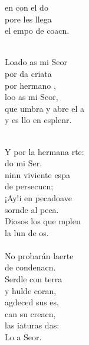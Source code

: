 \begin{cancion}
	en  con el do\\
	pore les llega\\
	el empo de  coacn. \\\jump\\
	\begin{chorus}%
	Loado as mi Seor\\
	por da criata\\
	por  hermano ,\\
	loo as mi Seor,\\
	que umbra y abre el a \\
	y es llo en esplenr.\\
	\end{chorus}%
	\jump\\
	Y por la hermana rte:\\
	do mi Ser.\\
	ninn viviente espa  \\
	de  persecucn;\\
	¡Ay!i en pecadoave\\
	sornde al peca.\\
	Diosos los que mplen \\
	la lun de os.\\
\jump\\
	No probarán laerte \\
	de condenacn.\\
	Serdle con terra \\
	y hulde coran,\\
	agdeced sus es, \\
	can su creacn,\\
	las iaturas das:\\
	Lo a Seor.\\\jump\\

\end{cancion}
